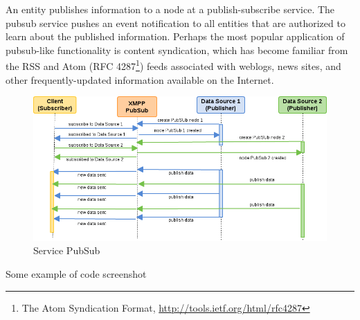 	An entity publishes information to a node at a publish-subscribe service. The pubsub service pushes an event notification to all entities that are authorized to learn about the published information. Perhaps the most popular application of pubsub-like functionality is content syndication, which has become familiar from the RSS and Atom (RFC 4287\footnote{The Atom Syndication Format, \url{http://tools.ietf.org/html/rfc4287}}) feeds associated with weblogs, news sites, and other frequently-updated information available on the Internet. 
    \begin{figure}[!ht]
    \centering
    \includegraphics[scale=0.6]{images/PubSub.png}   
    \caption[Service PubSub]{Service PubSub}
    \label{img:pub_sub}                           
    \end{figure}

	Some example of code screenshot

